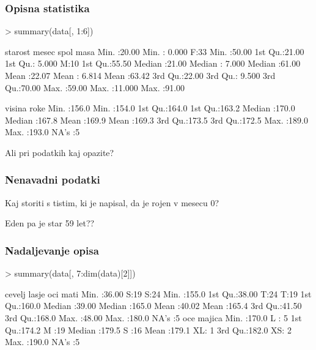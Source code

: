 \begin{frame}[fragile]
\frametitle{Opisna statistika}
\begin{Schunk}
\begin{Sinput}
> summary(data[, 1:6])
\end{Sinput}
\begin{Soutput}
    starost          mesec        spol        masa      
 Min.   :20.00   Min.   : 0.000   F:33   Min.   :50.00  
 1st Qu.:21.00   1st Qu.: 5.000   M:10   1st Qu.:55.50  
 Median :21.00   Median : 7.000          Median :61.00  
 Mean   :22.07   Mean   : 6.814          Mean   :63.42  
 3rd Qu.:22.00   3rd Qu.: 9.500          3rd Qu.:70.00  
 Max.   :59.00   Max.   :11.000          Max.   :91.00  
                                                        
     visina           roke      
 Min.   :156.0   Min.   :154.0  
 1st Qu.:164.0   1st Qu.:163.2  
 Median :170.0   Median :167.8  
 Mean   :169.9   Mean   :169.3  
 3rd Qu.:173.5   3rd Qu.:172.5  
 Max.   :189.0   Max.   :193.0  
                 NA's   :5      
\end{Soutput}
\end{Schunk}
Ali pri podatkih kaj opazite?
\end{frame}
\begin{frame}[fragile]
\frametitle{Nenavadni podatki}
Kaj storiti s tistim, ki je napisal, da je rojen v mesecu 0?

Eden pa je star 59 let??
\end{frame}


\begin{frame}[fragile]
\frametitle{Nadaljevanje opisa}
\begin{Schunk}
\begin{Sinput}
> summary(data[, 7:dim(data)[2]])
\end{Sinput}
\begin{Soutput}
     cevelj      lasje  oci         mati      
 Min.   :36.00   S:19   S:24   Min.   :155.0  
 1st Qu.:38.00   T:24   T:19   1st Qu.:160.0  
 Median :39.00                 Median :165.0  
 Mean   :40.02                 Mean   :165.4  
 3rd Qu.:41.50                 3rd Qu.:168.0  
 Max.   :48.00                 Max.   :180.0  
                               NA's   :5      
      oce        majica 
 Min.   :170.0   L : 5  
 1st Qu.:174.2   M :19  
 Median :179.5   S :16  
 Mean   :179.1   XL: 1  
 3rd Qu.:182.0   XS: 2  
 Max.   :190.0          
 NA's   :5              
\end{Soutput}
\end{Schunk}
\end{frame}
\clearpage
